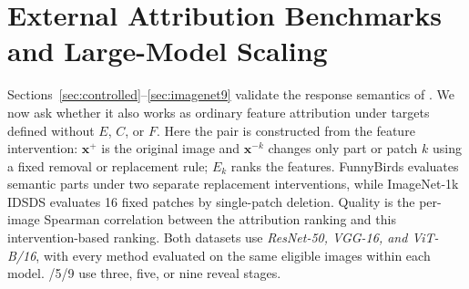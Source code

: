 
\section{External Attribution Benchmarks and Large-Model Scaling}
\label{sec:forward-attribution}

Sections~\ref{sec:controlled}--\ref{sec:imagenet9} validate the response
semantics of \decaf. We now ask whether it also works as ordinary feature
attribution under targets defined without $E$, $C$, or $F$. Here the pair is
constructed from the feature intervention: $\mathbf{x}^{+}$ is the original
image and $\mathbf{x}^{-k}$ changes only part or patch $k$ using a fixed
removal or replacement rule; $E_k$ ranks the features. FunnyBirds evaluates
semantic parts under two separate replacement interventions, while ImageNet-1k
IDSDS evaluates 16 fixed patches by single-patch deletion. Quality is the
per-image Spearman correlation between the attribution ranking and this
intervention-based ranking. Both datasets use
\emph{ResNet-50, VGG-16, and ViT-B/16}, with every method evaluated on the same
eligible images within each model. /5/9 use three, five, or nine reveal
stages.

